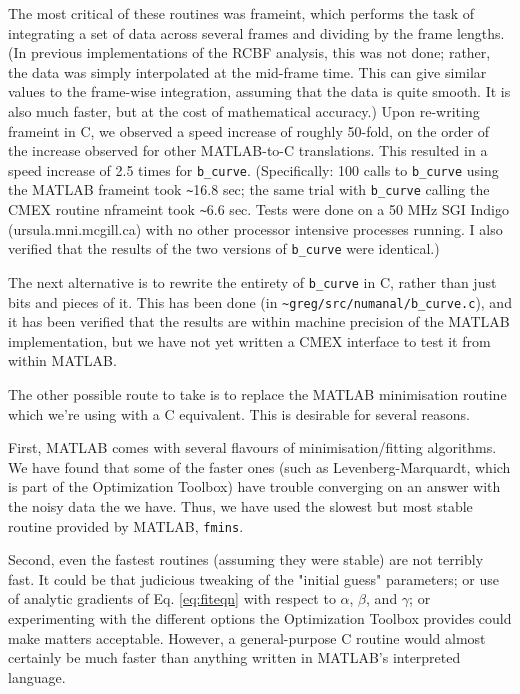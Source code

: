 The most critical of these routines was frameint, which performs the
task of integrating a set of data across several frames and dividing
by the frame lengths.  (In previous implementations of the RCBF
analysis, this was not done; rather, the data was simply interpolated
at the mid-frame time.  This can give similar values to the frame-wise
integration, assuming that the data is quite smooth.  It is also much
faster, but at the cost of mathematical accuracy.)  Upon re-writing
frameint in C, we observed a speed increase of roughly 50-fold, on the
order of the increase observed for other MATLAB-to-C translations.
This resulted in a speed increase of 2.5 times for
\verb|b_curve|.  (Specifically: 100 calls to \verb|b_curve| using the
MATLAB frameint took \verb|~|16.8 sec; the same trial with
\verb|b_curve| calling the CMEX routine nframeint took \verb|~|6.6 sec.
Tests were done on a 50 MHz SGI Indigo (ursula.mni.mcgill.ca) with no
other processor intensive processes running.  I also verified that the
results of the two versions of
\verb|b_curve| were identical.)

The next alternative is to rewrite the entirety of \verb|b_curve| in
C, rather than just bits and pieces of it.  This has been done (in
\verb|~greg/src/numanal/b_curve.c|), and it has been verified that the
results are within machine precision of the MATLAB implementation, but
we have not yet written a CMEX interface to test it from within MATLAB.

The other possible route to take is to replace the MATLAB minimisation
routine which we're using with a C equivalent.  This is desirable for
several reasons.

First, MATLAB comes with several flavours of minimisation/fitting
algorithms.  We have found that some of the faster ones (such as
Levenberg-Marquardt, which is part of the Optimization Toolbox) have
trouble converging on an answer with the noisy data the we have.
Thus, we have used the slowest but most stable routine provided by
MATLAB, \verb|fmins|.

Second, even the fastest routines (assuming they were stable) are not
terribly fast.  It could be that judicious tweaking of the "initial
guess" parameters; or use of analytic gradients of Eq. \ref{eq:fiteqn}
with respect to $\alpha$, $\beta$, and $\gamma$; or experimenting with
the different options the Optimization Toolbox provides could make
matters acceptable.  However, a general-purpose C routine would almost
certainly be much faster than anything written in MATLAB's interpreted
language.

